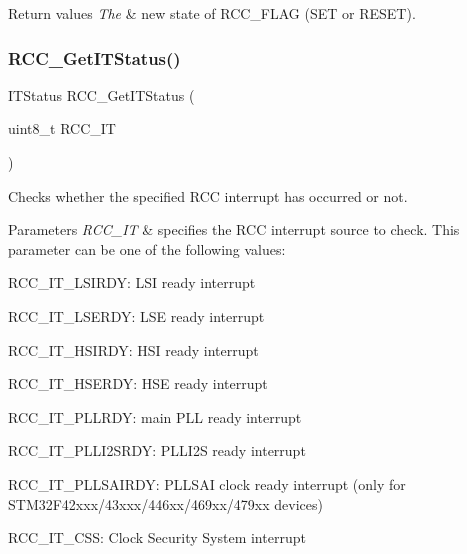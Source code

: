 \begin{DoxyRetVals}{Return values}
{\em The} & new state of R\+C\+C\+\_\+\+F\+L\+AG (S\+ET or R\+E\+S\+ET). \\
\hline
\end{DoxyRetVals}
\mbox{\label{group___r_c_c___group4_ga6126c99f398ee4be410ad76ae3aee18f}} 
\subsubsection{\texorpdfstring{R\+C\+C\+\_\+\+Get\+I\+T\+Status()}{RCC\_GetITStatus()}}
{\footnotesize\ttfamily I\+T\+Status R\+C\+C\+\_\+\+Get\+I\+T\+Status (\begin{DoxyParamCaption}\item[{uint8\+\_\+t}]{R\+C\+C\+\_\+\+IT }\end{DoxyParamCaption})}



Checks whether the specified R\+CC interrupt has occurred or not. 


\begin{DoxyParams}{Parameters}
{\em R\+C\+C\+\_\+\+IT} & specifies the R\+CC interrupt source to check. This parameter can be one of the following values\+: \begin{DoxyItemize}
\item R\+C\+C\+\_\+\+I\+T\+\_\+\+L\+S\+I\+R\+DY\+: L\+SI ready interrupt \item R\+C\+C\+\_\+\+I\+T\+\_\+\+L\+S\+E\+R\+DY\+: L\+SE ready interrupt \item R\+C\+C\+\_\+\+I\+T\+\_\+\+H\+S\+I\+R\+DY\+: H\+SI ready interrupt \item R\+C\+C\+\_\+\+I\+T\+\_\+\+H\+S\+E\+R\+DY\+: H\+SE ready interrupt \item R\+C\+C\+\_\+\+I\+T\+\_\+\+P\+L\+L\+R\+DY\+: main P\+LL ready interrupt \item R\+C\+C\+\_\+\+I\+T\+\_\+\+P\+L\+L\+I2\+S\+R\+DY\+: P\+L\+L\+I2S ready interrupt \item R\+C\+C\+\_\+\+I\+T\+\_\+\+P\+L\+L\+S\+A\+I\+R\+DY\+: P\+L\+L\+S\+AI clock ready interrupt (only for S\+T\+M32\+F42xxx/43xxx/446xx/469xx/479xx devices) \item R\+C\+C\+\_\+\+I\+T\+\_\+\+C\+SS\+: Clock Security System interrupt \end{DoxyItemize}
\\
\hline
\end{DoxyParams}

